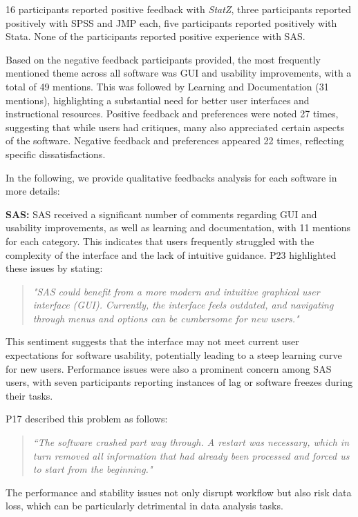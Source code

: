 \documentclass{article}
\begin{document}
16 participants reported positive feedback with \textit{StatZ}, three participants reported positively with SPSS and JMP each, five participants reported positively with Stata. None of the participants reported positive experience with SAS. 

Based on the negative feedback participants provided, the most frequently mentioned theme across all software was GUI and usability improvements, with a total of 49 mentions. This was followed by Learning and Documentation (31 mentions), highlighting a substantial need for better user interfaces and instructional resources. Positive feedback and preferences were noted 27 times, suggesting that while users had critiques, many also appreciated certain aspects of the software. Negative feedback and preferences appeared 22 times, reflecting specific dissatisfactions.

In the following, we provide qualitative feedbacks analysis for each software in more details:

\textbf{SAS:} 
SAS received a significant number of comments regarding GUI and usability improvements, as well as learning and documentation, with 11 mentions for each category. This indicates that users frequently struggled with the complexity of the interface and the lack of intuitive guidance. P23 highlighted these issues by stating:

\begin{quote} \emph{"SAS could benefit from a more modern and intuitive graphical user interface (GUI). Currently, the interface feels outdated, and navigating through menus and options can be cumbersome for new users." } \end{quote}

This sentiment suggests that the interface may not meet current user expectations for software usability, potentially leading to a steep learning curve for new users. Performance issues were also a prominent concern among SAS users, with seven participants reporting instances of lag or software freezes during their tasks.

P17 described this problem as follows:

\begin{quote} \emph{``The software crashed part way through. A restart was necessary, which in turn removed all information that had already been processed and forced us to start from the beginning." } \end{quote}

The performance and stability issues not only disrupt workflow but also risk data loss, which can be particularly detrimental in data analysis tasks. 
\end{document}
